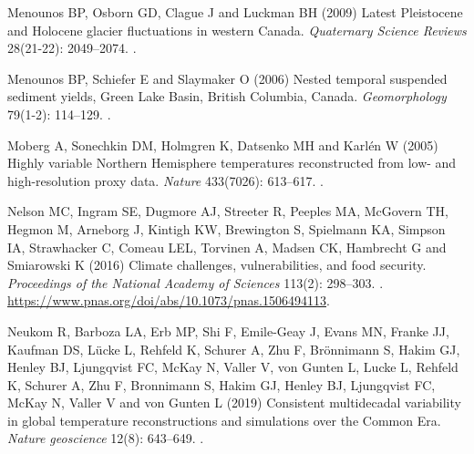 \documentclass[Royal,times,doublespace,sageh]{sagej}
\begin{document}
\begin{thebibliography}{68}
{
Menounos BP, Osborn GD, Clague J and Luckman BH (2009) {Latest Pleistocene and
  Holocene glacier fluctuations in western Canada}.
\newblock \emph{Quaternary Science Reviews} 28(21-22): 2049--2074.
\newblock {}.

Menounos BP, Schiefer E and Slaymaker O (2006) {Nested temporal suspended
  sediment yields, Green Lake Basin, British Columbia, Canada}.
\newblock \emph{Geomorphology} 79(1-2): 114--129.
\newblock {}.

Moberg A, Sonechkin DM, Holmgren K, Datsenko MH and Karl{\'{e}}n W (2005)
  {Highly variable Northern Hemisphere temperatures reconstructed from low- and
  high-resolution proxy data}.
\newblock \emph{Nature} 433(7026): 613--617.
\newblock {}.

Nelson MC, Ingram SE, Dugmore AJ, Streeter R, Peeples MA, McGovern TH, Hegmon
  M, Arneborg J, Kintigh KW, Brewington S, Spielmann KA, Simpson IA,
  Strawhacker C, Comeau LEL, Torvinen A, Madsen CK, Hambrecht G and Smiarowski
  K (2016) {Climate challenges, vulnerabilities, and food security}.
\newblock \emph{Proceedings of the National Academy of Sciences} 113(2):
  298--303.
\newblock {}.
\newblock \urlprefix\url{https://www.pnas.org/doi/abs/10.1073/pnas.1506494113}.

Neukom R, Barboza LA, Erb MP, Shi F, Emile-Geay J, Evans MN, Franke JJ, Kaufman
  DS, L{\"{u}}cke L, Rehfeld K, Schurer A, Zhu F, Br{\"{o}}nnimann S, Hakim GJ,
  Henley BJ, Ljungqvist FC, McKay N, Valler V, von Gunten L, Lucke L, Rehfeld
  K, Schurer A, Zhu F, Bronnimann S, Hakim GJ, Henley BJ, Ljungqvist FC, McKay
  N, Valler V and von Gunten L (2019) {Consistent multidecadal variability in
  global temperature reconstructions and simulations over the Common Era}.
\newblock \emph{Nature geoscience} 12(8): 643--649.
\newblock {}.

}
\end{thebibliography}
\end{document}
